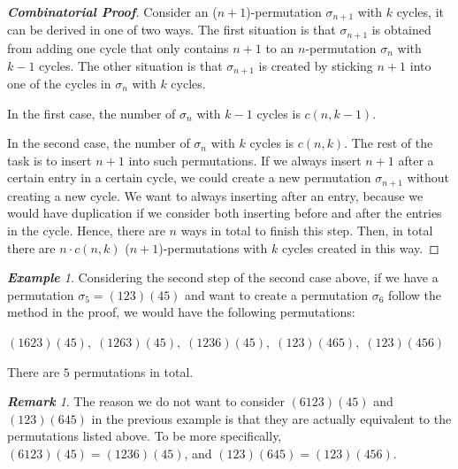 \documentclass{article}
\theoremstyle{definition}
\theoremstyle{remark}
\newtheorem*{remark}{\textbf{Remark}}
\theoremstyle{example}
\newtheorem{example}{\textbf{Example}}[section]
\begin{document}
\begin{proof}[\textbf{Combinatorial Proof}]\label{prf:RRpf1st}
    Consider an ($n+1$)-permutation $\sigma_{n+1}$ with $k$ cycles, it can be derived in one of two ways. The first situation is that $\sigma_{n+1}$ is obtained from adding one cycle that only contains $n+1$ to an $n$-permutation $\sigma_n$ with $k-1$ cycles. The other situation is that $\sigma_{n+1}$ is created by sticking $n+1$ into one of the cycles in $\sigma_n$ with $k$ cycles.
    
    In the first case, the number of $\sigma_n$ with $k-1$ cycles is $c(n,k-1)$.
    
    In the second case, the number of $\sigma_n$ with $k$ cycles is $c(n,k)$. The rest of the task is to insert $n+1$ into such permutations. If we always insert $n+1$ after a certain entry in a certain cycle, we could create a new permutation $\sigma_{n+1}$ without creating a new cycle. We want to always inserting after an entry, because we would have duplication if we consider both inserting before and after the entries in the cycle. Hence, there are $n$ ways in total to finish this step. Then, in total there are $n\cdot c(n,k)$ ($n+1$)-permutations with $k$ cycles created in this way.
\end{proof}

\begin{example}
Considering the second step of the second case above, if we have a permutation $\sigma_5 = (123)(45)$ and want to create a permutation $\sigma_6$ follow the method in the proof, we would have the following permutations:
    \begin{center}
        $(1623)(45), \; (1263)(45), \; (1236)(45), \; (123)(465), \;(123)(456)$
    \end{center}
    There are $5$ permutations in total. 
\end{example}

\begin{remark}
    The reason we do not want to consider $(6123)(45)$ and $(123)(645)$ in the previous example is that they are actually equivalent to the permutations listed above. To be more specifically, $(6123)(45) = (1236)(45)$, and $(123)(645) = (123)(456)$.
\end{remark}
\end{document}
